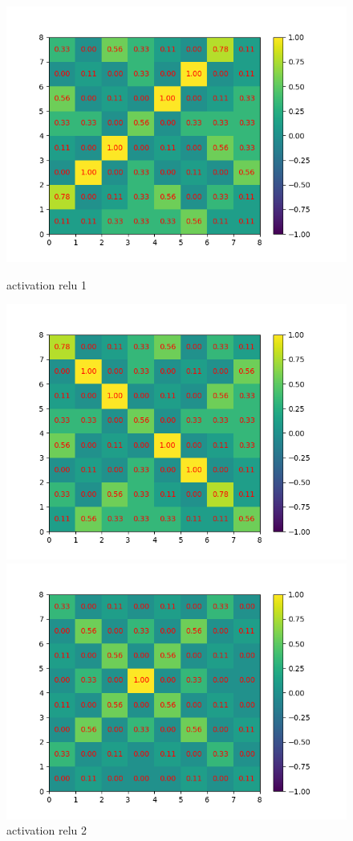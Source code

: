 \begin{figure}[h]
        \includegraphics[width=\textwidth]{img/cnn_exemple/cross/activation_relu_1.png}
        \caption{activation relu 1}
    \endminipage\hfill
        \includegraphics[width=\textwidth]{img/cnn_exemple/cross/activation_relu_2.png}
        \caption{activation relu 2}
    \endminipage\hfill
        \includegraphics[width=\textwidth]{img/cnn_exemple/cross/activation_relu_3.png}

\end{figure}
